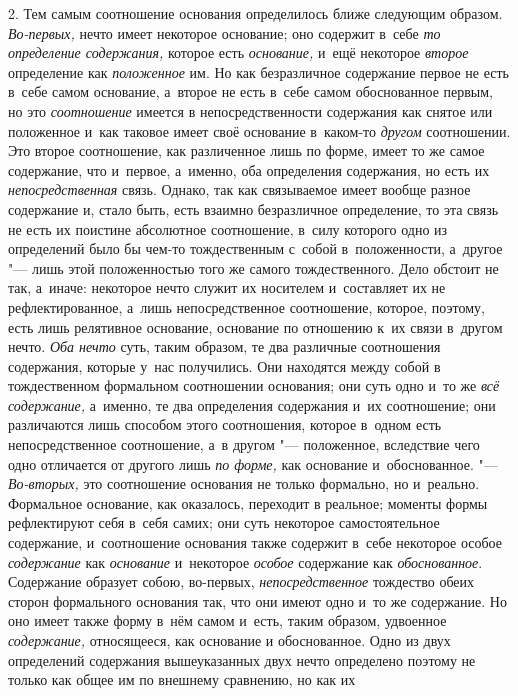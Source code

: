 2. Тем самым соотношение основания определилось ближе следующим образом.
{\em Во-первых,} нечто имеет некоторое основание; оно
содержит в~себе {\em то определение содержания,}
которое есть {\em основание,} и~ещё некоторое
{\em второе} определение как
{\em положенное} им. Но как безразличное содержание
первое не есть в~себе самом основание, а~второе не есть в~себе самом
обоснованное первым, но это {\em соотношение} имеется в
непосредственности содержания как снятое или положенное и~как таковое имеет
своё основание в~каком-то {\em другом} соотношении. Это
второе соотношение, как различенное лишь по форме, имеет то же самое
содержание, что и~первое, а~именно, оба определения содержания, но есть их
{\em непосредственная} связь. Однако, так как
связываемое имеет вообще разное содержание и, стало быть, есть взаимно
безразличное определение, то эта связь не есть их поистине абсолютное
соотношение, в~силу которого одно из определений было бы чем-то
тождественным с~собой в~положенности, а~другое "--- лишь этой положенностью
того же самого тождественного. Дело обстоит не так, а~иначе: некоторое
нечто служит их носителем и~составляет их не рефлектированное, а~лишь
непосредственное соотношение, которое, поэтому, есть лишь релятивное
основание, основание по отношению к~их связи в~другом нечто.
{\em Оба нечто} суть, таким образом, те два различные
соотношения содержания, которые у~нас получились. Они находятся между собой
в тождественном формальном соотношении основания; они суть одно и~то же
{\em всё содержание,} а~именно, те два определения
содержания и~их соотношение; они различаются лишь способом этого
соотношения, которое в~одном есть непосредственное соотношение, а~в другом
"--- положенное, вследствие чего одно отличается от другого лишь
{\em по форме,} как основание и~обоснованное. "---
{\em Во-вторых,} это соотношение основания не только
формально, но и~реально. Формальное основание, как оказалось, переходит в
реальное; моменты формы рефлектируют себя в~себя самих; они суть некоторое
самостоятельное содержание, и~соотношение основания также содержит в~себе
некоторое особое {\em содержание} как {\em основание} и~некоторое
{\em особое} содержание как {\em обоснованное}. Содержание образует собою,
во-первых, {\em непосредственное} тождество обеих
сторон формального основания так, что они имеют одно и~то же содержание. Но
оно имеет также форму в~нём самом и~есть, таким образом, удвоенное
{\em содержание,} относящееся, как основание и
обоснованное. Одно из двух определений содержания вышеуказанных двух нечто
определено поэтому не только как общее им по внешнему сравнению, но как их
